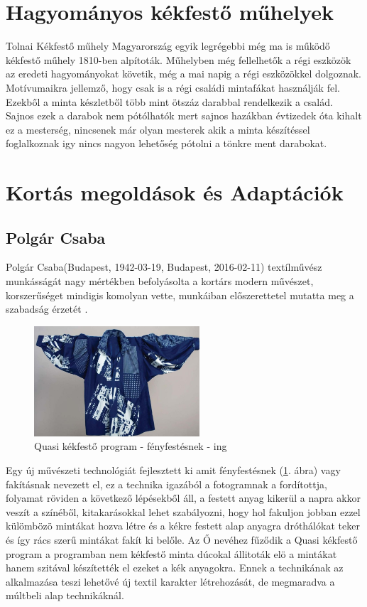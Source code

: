 \documentclass[fontsize=12pt, appendixprefix=true]{scrreprt}
\begin{document}
\section{Hagyományos kékfestő műhelyek}
Tolnai Kékfestő műhely Magyarország  egyik legrégebbi még ma is működő kékfestő műhely 1810-ben alpítoták.
Műhelyben még fellelhetők a régi eszközök az eredeti hagyományokat követik, még a mai napig a régi eszközökkel dolgoznak.
Motívumaikra jellemző, hogy csak is a régi családi mintafákat használják fel.
Ezekből a minta készletből több mint ötszáz darabbal rendelkezik a család.
Sajnos ezek a darabok nem pótólhatók mert sajnos hazákban évtizedek óta kihalt ez a mesterség, nincsenek már olyan mesterek akik a minta készítéssel foglalkoznak igy nincs nagyon lehetőség pótolni a tönkre 
ment darabokat.

\section{Kortás megoldások és Adaptációk}

\subsection{Polgár Csaba}
Polgár Csaba(Budapest, 1942-03-19, Budapest, 2016-02-11) textílművész munkásságát nagy mértékben befolyásolta a kortárs modern művészet, korszerűséget mindigis komolyan vette, munkáiban előszerettetel mutatta meg a szabadság érzetét \cite{plogarcs}.

\begin{figure}[ht!]
	\centering
	\includegraphics[width=0.55\textwidth]{img/quasi.jpg}
	\caption{Quasi kékfestő program - fényfestésnek - ing}
	\label{fig:quasi}
\end{figure}

Egy új művészeti technológiát fejlesztett ki amit fényfestésnek (\ref{fig:quasi}. ábra) vagy fakításnak nevezett el, ez a technika igazából a fotogramnak a fordítottja, folyamat röviden  a következő lépésekből áll, a festett anyag kikerül a napra akkor veszít a színéből, kitakarásokkal lehet szabályozni, hogy hol fakuljon jobban ezzel külömbözö mintákat hozva létre és a kékre festett alap anyagra dróthálókat teker és így rács szerű mintákat fakít ki belőle.
Az Ő nevéhez fűződik a Quasi kékfestő program  a programban nem  kékfestő minta dúcokal állitoták elö a mintákat hanem szitával készítették el ezeket a kék anyagokra. Ennek a technikának az alkalmazása teszi lehetővé új textil karakter  létrehozását, de megmaradva a múltbeli alap technikáknál.
\end{document}
